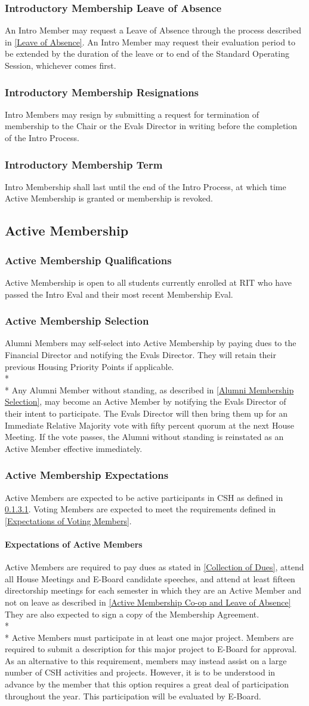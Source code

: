 \documentclass{article}
\newcommand{\asection}[1]{\subsection{#1} \label{#1}}
\newcommand{\asubsection}[1]{\subsubsection{#1} \label{#1}}
\newcommand{\asubsubsection}[1]{\paragraph{#1} \label{#1}}
\begin{document}
\asubsection{Introductory Membership Leave of Absence}
An Intro Member may request a Leave of Absence through the process described in \ref{Leave of Absence}.
An Intro Member may request their evaluation period to be extended by the duration of the leave or to end of the Standard Operating Session, whichever comes first.

\asubsection{Introductory Membership Resignations}
Intro Members may resign by submitting a request for termination of membership to the Chair or the Evals Director in writing before the completion of the Intro Process.

\asubsection{Introductory Membership Term}
Intro Membership shall last until the end of the Intro Process, at which time Active Membership is granted or membership is revoked.

\asection{Active Membership}

\asubsection{Active Membership Qualifications}
Active Membership is open to all students currently enrolled at RIT who have passed the Intro Eval and their most recent Membership Eval.

\asubsection{Active Membership Selection}
Alumni Members may self-select into Active Membership by paying dues to the Financial Director and notifying the Evals Director. They will retain their previous Housing Priority Points if applicable.
\\*\\*
Any Alumni Member without standing, as described in \ref{Alumni Membership Selection}, may become an Active Member by notifying the Evals Director of their intent to participate.
The Evals Director will then bring them up for an Immediate Relative Majority vote with fifty percent quorum at the next House Meeting.
If the vote passes, the Alumni without standing is reinstated as an Active Member effective immediately.

\asubsection{Active Membership Expectations}
Active Members are expected to be active participants in CSH as defined in \ref{Expectations of Active Members}.
Voting Members are expected to meet the requirements defined in \ref{Expectations of Voting Members}.

\asubsubsection{Expectations of Active Members}
Active Members are required to pay dues as stated in \ref{Collection of Dues}, attend all House Meetings and E-Board candidate speeches, and attend at least fifteen directorship meetings for each semester in which they are an Active Member and not on leave as described in \ref{Active Membership Co-op and Leave of Absence}
They are also expected to sign a copy of the Membership Agreement.
\\* \\*
Active Members must participate in at least one major project.
Members are required to submit a description for this major project to E-Board for approval.
As an alternative to this requirement, members may instead assist on a large number of CSH activities and projects.
However, it is to be understood in advance by the member that this option requires a great deal of participation throughout the year.
This participation will be evaluated by E-Board.
\end{document}
